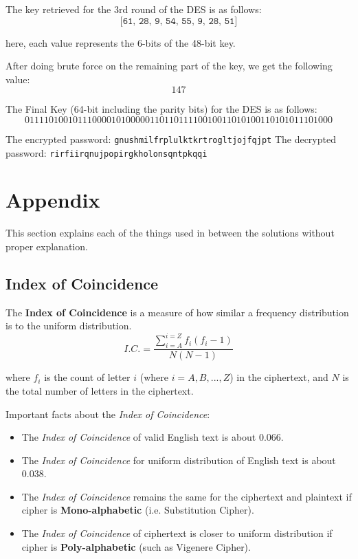 \documentclass[10pt,twoside]{article}
\begin{document}
The key retrieved for the 3rd round of the DES is as follows:
$$\texttt{[61, 28, 9, 54, 55, 9, 28, 51]}$$

here, each value represents the 6-bits of the 48-bit key. \newline 

After doing brute force on the remaining part of the key, we get the following value:
$$147$$

The Final Key (64-bit including the parity bits) for the DES is as follows:
$$0111101001011100001010000011011011110010011010100110101011101000$$

The encrypted password: \texttt{gnushmilfrplulktkrtrogltjojfqjpt} \newline
The decrypted password: \texttt{rirfiirqnujpopirgkholonsqntpkqqi}

\newpage
\section{Appendix}

This section explains each of the things used in between the solutions without proper explanation.

\subsection{Index of Coincidence} \label{ic}

The \textbf{Index of Coincidence} is a measure of how similar a frequency distribution is to the uniform distribution.
$$ I.C. = \frac{\sum_{i=A}^{i=Z} f_i(f_i-1)}{N(N-1)}$$

where $f_i$ is the count of letter $i$ (where $i = A,B,...,Z$) in the ciphertext, and $N$ is the total number of letters in the ciphertext. \newline

Important facts about the \textit{Index of Coincidence}:
\begin{itemize}
  \setlength\itemsep{0em}
    \item The \textit{Index of Coincidence} of valid English text is about $0.066$.
    \item The \textit{Index of Coincidence} for uniform distribution of English text is about $0.038$.
    \item The \textit{Index of Coincidence} remains the same for the ciphertext and plaintext if cipher is \textbf{Mono-alphabetic} (i.e. Substitution Cipher).
    \item The \textit{Index of Coincidence} of ciphertext is closer to uniform distribution if cipher is \textbf{Poly-alphabetic} (such as Vigenere Cipher).
\end{itemize}
\end{document}
